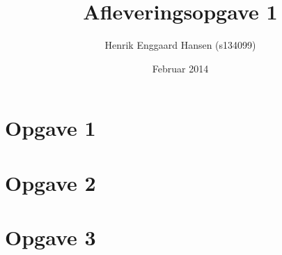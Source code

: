 \documentclass{article}
\begin{document}
\title{Afleveringsopgave 1}
\author{Henrik Enggaard Hansen (s134099)}
\date{Februar 2014}
\maketitle

\section*{Opgave 1}

\section*{Opgave 2}

\section*{Opgave 3}
\end{document}
